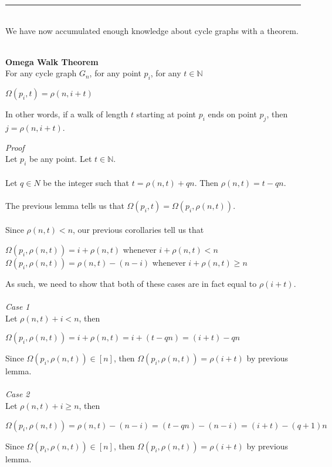 \documentclass[a4paper,12pt]{article}
\begin{document}
\begin{center}
\noindent\rule{8cm}{0.4pt}
\end{center}
\noindent
\\
We have now accumulated enough knowledge about cycle graphs with a theorem.\\
\\
\label{theorem:omega}
\begin{tcolorbox}
\textbf{Omega Walk Theorem}\\
For any cycle graph $G_n$, for any point $p_i$, for any $t \in \mathbb{N}$
\begin{center}
$\Omega(p_i, t) = \rho(n, i + t)$
\end{center}
In other words, if a walk of length $t$ starting at point $p_i$ ends on point $p_j$, then $j = \rho(n, i + t)$.
\end{tcolorbox}
\noindent
\textit{Proof}\\
Let $p_i$ be any point. Let $t \in \mathbb{N}$.\\
\\
Let $q \in N$ be the integer such that $t = \rho(n, t) + qn$. Then $\rho(n, t) = t - qn$.\\
\\
The previous lemma tells us that $\Omega(p_i, t) = \Omega(p_i, \rho(n, t))$.\\
\\
Since $\rho(n, t) < n$, our previous corollaries tell us that
\begin{center}
$\Omega(p_i, \rho(n, t)) = i + \rho(n, t)$ whenever $i + \rho(n, t) < n$\\
$\Omega(p_i, \rho(n, t)) = \rho(n, t) - (n - i)$ whenever $i + \rho(n, t) \geq n$
\end{center}
As such, we need to show that both of these cases are in fact equal to $\rho(i + t)$.\\
\\
\textit{Case 1}\\
Let $\rho(n, t) + i < n$, then 
\begin{center}
$\Omega(p_i, \rho(n, t)) = i + \rho(n, t) = i + (t - qn) = (i + t) - qn$
\end{center}
Since $\Omega(p_i, \rho(n, t)) \in [n]$, then $\Omega(p_i, \rho(n, t)) = \rho(i + t)$ by previous lemma.\\
\\
\textit{Case 2}\\
Let $\rho(n, t) + i \geq n$, then 
\begin{center}
$\Omega(p_i, \rho(n, t)) = \rho(n, t) - (n - i) = (t - qn) - (n - i) = (i + t) - (q + 1)n$
\end{center}
Since $\Omega(p_i, \rho(n, t)) \in [n]$, then $\Omega(p_i, \rho(n, t)) = \rho(i + t)$ by previous lemma.
\end{document}
